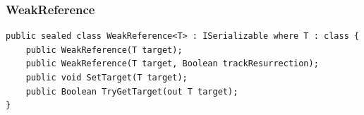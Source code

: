 \documentclass[xetex,mathserif,serif]{beamer}
\begin{document}
    \begin{frame}[fragile]
        \frametitle{WeakReference}
        \begin{scriptsize}
            \begin{verbatim}
public sealed class WeakReference<T> : ISerializable where T : class {
    public WeakReference(T target);
    public WeakReference(T target, Boolean trackResurrection);
    public void SetTarget(T target);
    public Boolean TryGetTarget(out T target);
}
            \end{verbatim}
        \end{scriptsize}
    \end{frame}
\end{document}
